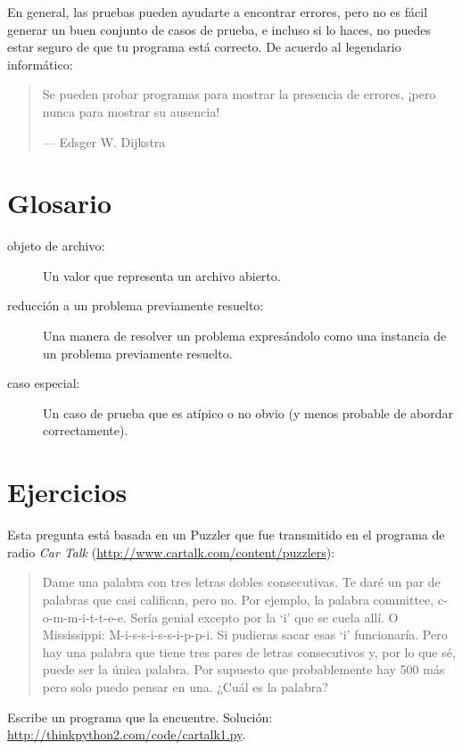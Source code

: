 \documentclass[10pt]{book}
\begin{document}
En general, las pruebas pueden ayudarte a encontrar errores, pero no es fácil
generar un buen conjunto de casos de prueba, e incluso si lo haces, no puedes
estar seguro de que tu programa está correcto.
De acuerdo al legendario informático:

\begin{quote}
Se pueden probar programas para mostrar la presencia de errores, ¡pero nunca para
mostrar su ausencia!

--- Edsger W. Dijkstra
\end{quote}


\section{Glosario}

\begin{description}

\item[objeto de archivo:] Un valor que representa un archivo abierto.

\item[reducción a un problema previamente resuelto:] Una manera de resolver un
  problema expresándolo como una instancia de un problema previamente
  resuelto.  

\item[caso especial:] Un caso de prueba que es atípico o no obvio
(y menos probable de abordar correctamente).

\end{description}


\section{Ejercicios}

\begin{exercise}

Esta pregunta está basada en un Puzzler que fue transmitido en el programa
de radio {\em Car Talk}
(\url{http://www.cartalk.com/content/puzzlers}):

\begin{quote}
Dame una palabra con tres letras dobles consecutivas. Te daré un
par de palabras que casi califican, pero no. Por ejemplo, la palabra
committee, c-o-m-m-i-t-t-e-e. Sería genial excepto por la `i' que
se cuela allí. O Mississippi: M-i-s-s-i-s-s-i-p-p-i. Si pudieras
sacar esas `i' funcionaría. Pero hay una palabra que tiene tres
pares de letras consecutivos y, por lo que sé, puede ser
la única palabra. Por supuesto que probablemente hay 500 más pero solo puedo
pensar en una. ¿Cuál es la palabra?
\end{quote}

Escribe un programa que la encuentre.
Solución: \url{http://thinkpython2.com/code/cartalk1.py}.

\end{exercise}
\end{document}
